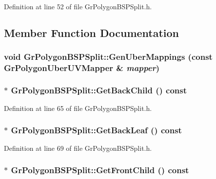 Definition at line 52 of file GrPolygonBSPSplit.h.

\subsection{Member Function Documentation}
\hypertarget{class_gr_polygon_b_s_p_split_cb59fb26224b90718ee2152591ce1689}{
\subsubsection[{GenUberMappings}]{\setlength{\rightskip}{0pt plus 5cm}void GrPolygonBSPSplit::GenUberMappings (const {\bf GrPolygonUberUVMapper} \& {\em mapper})}}
\label{class_gr_polygon_b_s_p_split_cb59fb26224b90718ee2152591ce1689}


\hypertarget{class_gr_polygon_b_s_p_split_015a96ec133801c0d49b3c3ef99d690d}{
\subsubsection[{GetBackChild}]{$\ast$ GrPolygonBSPSplit::GetBackChild () const}}
\label{class_gr_polygon_b_s_p_split_015a96ec133801c0d49b3c3ef99d690d}




Definition at line 65 of file GrPolygonBSPSplit.h.\hypertarget{class_gr_polygon_b_s_p_split_f729026e82d6699b67523cec6fa8f4b6}{
\subsubsection[{GetBackLeaf}]{$\ast$ GrPolygonBSPSplit::GetBackLeaf () const}}
\label{class_gr_polygon_b_s_p_split_f729026e82d6699b67523cec6fa8f4b6}




Definition at line 69 of file GrPolygonBSPSplit.h.\hypertarget{class_gr_polygon_b_s_p_split_8a418bd7c053b3249cffedef4c13c74a}{
\subsubsection[{GetFrontChild}]{$\ast$ GrPolygonBSPSplit::GetFrontChild () const}}
\label{class_gr_polygon_b_s_p_split_8a418bd7c053b3249cffedef4c13c74a}




